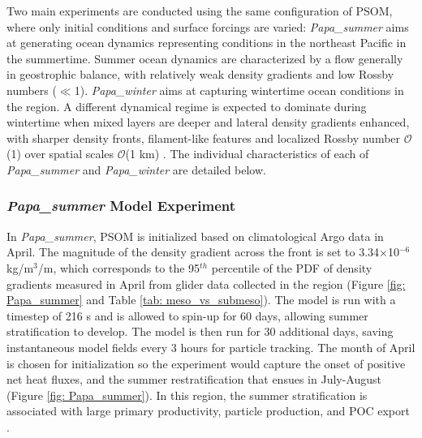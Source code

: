 \documentclass[draft,linenumbers]{agujournal2018}
\begin{document}
Two main experiments are conducted using the same configuration of PSOM, where only initial conditions and surface forcings are varied: \textit{Papa\_summer} aims at generating ocean dynamics representing conditions in the northeast Pacific in the summertime. Summer ocean dynamics are characterized by a flow generally in geostrophic balance, with relatively weak density gradients and low Rossby numbers ($\ll$1). \textit{Papa\_winter} aims at capturing wintertime ocean conditions in the region. A different dynamical regime is expected to dominate during wintertime when mixed layers are deeper and lateral density gradients enhanced, with sharper density fronts, filament-like features and localized Rossby number $\mathcal{O}$(1) over spatial scales $\mathcal{O}$(1 km) \citep{Mensa_2013,Callies_2015,Thompson_2016}. The individual characteristics of each of \textit{Papa\_summer} and \textit{Papa\_winter} are detailed below.

\subsubsection{\textit{Papa\_summer} Model Experiment}

In \textit{Papa\_summer}, PSOM is initialized based on climatological Argo data in April. The magnitude of the density gradient across the front is set to 3.34$\times$10$^{-6}$ kg/m$^3$/m, which corresponds to the 95$^{th}$ percentile of the PDF of density gradients measured in April from glider data collected in the region (Figure \ref{fig: Papa_summer} and Table \ref{tab: meso_vs_submeso}). The model is run with a timestep of 216 s and is allowed to spin-up for 60 days, allowing summer stratification to develop. The model is then run for 30 additional days, saving instantaneous model fields every 3 hours for particle tracking. The month of April is chosen for initialization so the experiment would capture the onset of positive net heat fluxes, and the summer restratification that ensues in July-August (Figure \ref{fig: Papa_summer}). In this region, the summer stratification is associated with large primary productivity, particle production, and POC export \citep[e.g., fecal pellets, dead phytoplankter; ][]{Plant_2016}.
\end{document}
